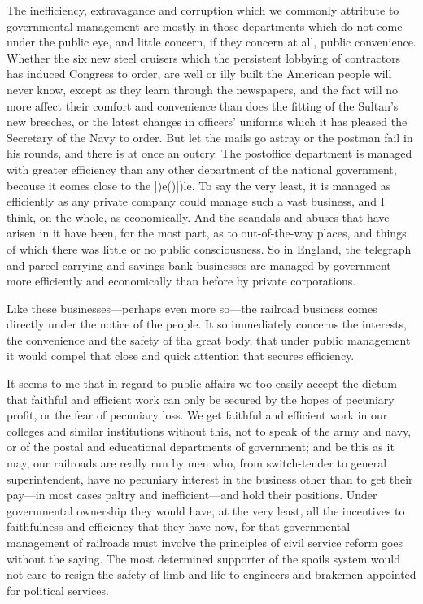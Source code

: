 \documentclass{book}
\begin{document}
The inefficiency, extravagance and corruption which we commonly attribute to governmental management are mostly in those departments which do not come under the public eye, and little concern, if they concern at all, public convenience. Whether the six new steel cruisers which the persistent lobbying of contractors has induced Congress to order, are well or illy built the American people will never know, except as they learn through the newspapers, and the fact will no more affect their comfort and convenience than does the fitting of the Sultan’s new breeches, or the latest changes in officers’ uniforms which it has pleased the Secretary of the Navy to order. But let the mails go astray or the postman fail in his rounds, and there is at once an outcry. The postoffice department is managed with greater efficiency than any other department of the national government, because it comes close to the {]})e()|)le. To say the very least, it is managed as efficiently as any private company could manage such a vast business, and I think, on the whole, as economically. And the scandals and abuses that have arisen in it have been, for the most part, as to out-of-the-way places, and things of which there was little or no public consciousness. So in England, the telegraph and parcel-carrying and savings bank businesses are managed by government more efficiently and economically than before by private corporations.

Like these businesses—perhaps even more so—the railroad business comes directly under the notice of the people. It so immediately concerns the interests, the convenience and the safety of tha great body, that under public management it would compel that close and quick attention that secures efficiency.

It seems to me that in regard to public affairs we too easily accept the dictum that faithful and efficient work can only be secured by the hopes of pecuniary profit, or the fear of pecuniary loss. We get faithful and efficient work in our colleges and similar institutions without this, not to speak of the army and navy, or of the postal and educational departments of government; and be this as it may, our railroads are really run by men who, from switch-tender to general superintendent, have no pecuniary interest in the business other than to get their pay—in most cases paltry and inefficient—and hold their positions. Under governmental ownership they would have, at the very least, all the incentives to faithfulness and efficiency that they have now, for that governmental management of railroads must involve the principles of civil service reform goes without the saying. The most determined supporter of the spoils system would not care to resign the safety of limb and life to engineers and brakemen appointed for political services.
\end{document}
